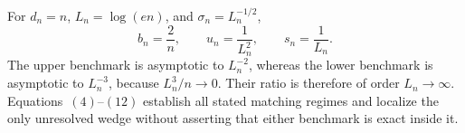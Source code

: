 For \(d_n=n\), \(L_n=\log(en)\), and \(\sigma_n=L_n^{-1/2}\),
\[
 b_n=\frac2n,\qquad u_n=\frac1{L_n^2},\qquad s_n=\frac1{L_n}.
\tag{13}
\]
The upper benchmark is asymptotic to \(L_n^{-2}\), whereas the lower benchmark is asymptotic to \(L_n^{-3}\), because \(L_n^3/n\to0\).  Their ratio is therefore of order \(L_n\to\infty\).  Equations~\((4)\)--\((12)\) establish all stated matching regimes and localize the only unresolved wedge without asserting that either benchmark is exact inside it.